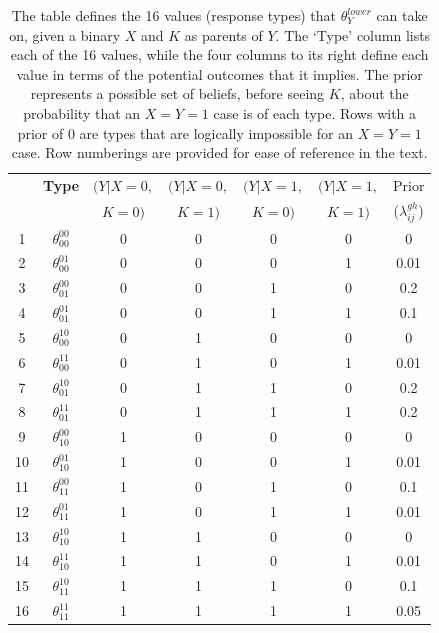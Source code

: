 \documentclass[12pt,]{book}
\begin{document}
\begin{table}[h!]
  \centering
  \def\arraystretch{1.3}
    \begin{tabular}{ccccccc}
    \hline
    \textbf {} & \textbf {Type} &  $(Y | X=0,$ & $(Y |X=0, $ & $(Y | X=1, $ & $(Y | X=1, $  & Prior\\
         & & $K=0)$ & $K=1)$ & $K=0)$ & $K=1)$ & ($\lambda_{ij}^{gh}$) \\  \hline
    1 & $\theta_{00}^{00}$          &  0     & 0     & 0     & 0  & 0 \\
    2 & $\theta_{00}^{01}$  & 0     & 0     & 0     & 1 & 0.01 \\
    3 & $\theta_{01}^{00}$  & 0     & 0     & 1     & 0 & 0.2 \\
    4 & $\theta_{01}^{01}$          & 0     & 0     & 1     & 1 & 0.1 \\
    5 & $\theta_{00}^{10}$  & 0     & 1     & 0     & 0 & 0 \\
    6 & $\theta_{00}^{11}$          & 0     & 1     & 0     & 1 & 0.01 \\
    7 & $\theta_{01}^{10}$  & 0     & 1     & 1     & 0 & 0.2 \\
    8 & $\theta_{01}^{11}$      & 0     & 1     & 1     & 1 & 0.2 \\
    9 & $\theta_{10}^{00}$          & 1     & 0     & 0     & 0 & 0 \\
    10 & $\theta_{10}^{01}$     & 1     & 0     & 0     & 1 & 0.01 \\
    11 & $\theta_{11}^{00}$         & 1     & 0     & 1     & 0 & 0.1 \\
    12 & $\theta_{11}^{01}$     & 1     & 0     & 1     & 1 & 0.01 \\
    13 & $\theta_{10}^{10}$         & 1     & 1     & 0     & 0 & 0 \\
    14 & $\theta_{10}^{11}$     & 1     & 1     & 0     & 1 & 0.01 \\
    15 & $\theta_{11}^{10}$     & 1     & 1     & 1     & 0 & 0.1 \\
    16 & $\theta_{11}^{11}$         & 1     & 1     & 1     & 1 & 0.05 \\
    \bottomrule
    \end{tabular}%
   \caption{The table defines the 16 values (response types) that $\theta_Y^{lower}$ can take on, given a binary $X$ and $K$ as parents of $Y$. The `Type' column lists each of the 16 values, while the four columns to its right define each value in terms of the potential outcomes that it implies. The prior represents a possible set of beliefs, before seeing $K$, about the probability that an $X=Y=1$ case is of each type. Rows with a prior of 0 are types that are logically impossible for an $X=Y=1$ case. Row numberings are provided for ease of reference in the text.}
  \label{typesmoderation}%
\end{table}
\end{document}
